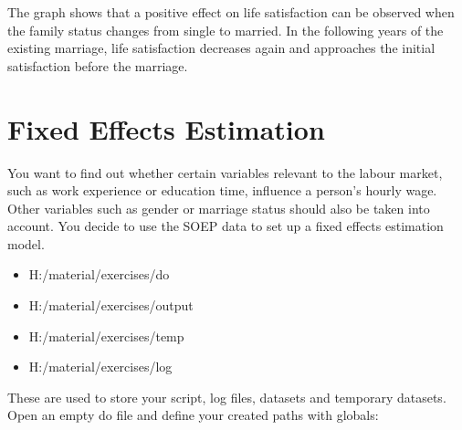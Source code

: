 \documentclass[letterpaper,10pt,openany,onesideH,english]{sphinxmanual}
\begin{document}
\begin{figure}[H]
\centering

\noindent{}
\end{figure}

The graph shows that a positive effect on life satisfaction can be observed when the family status changes from single to married. In the following years of the existing marriage, life satisfaction decreases again and approaches the initial satisfaction before the marriage.


\section{Fixed Effects Estimation}
\label{\detokenize{Working with SOEP Data/index:fixed-effects-estimation}}
You want to find out whether certain variables relevant to the labour market, such as work experience or education time, influence a person’s hourly wage. Other variables such as gender or marriage status should also be taken into account. You decide to use the SOEP data to set up a fixed effects estimation model.


\begin{figure}[H]
\centering

\noindent{}
\end{figure}

\begin{itemize}
\item {} 
H:/material/exercises/do

\item {} 
H:/material/exercises/output

\item {} 
H:/material/exercises/temp

\item {} 
H:/material/exercises/log

\end{itemize}

These are used to store your script, log files, datasets and temporary datasets. Open an empty do file and define your created paths with globals:
\end{document}
